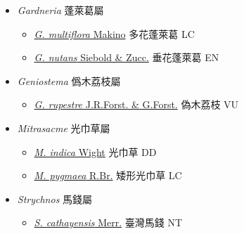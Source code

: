 
  \begin{itemize}
 \item[] \textit{Gardneria} 蓬萊葛屬
                    
  \begin{itemize}
        \item[] \href{http://www.theplantlist.org/tpl1.1/search?q=Gardneria+multiflora}{\textit{G. multiflora} Makino}   多花蓬萊葛 LC
        \item[] \href{http://www.theplantlist.org/tpl1.1/search?q=Gardneria+nutans}{\textit{G. nutans} Siebold \& Zucc.}   垂花蓬萊葛 EN
  \end{itemize}
 \item[] \textit{Geniostema} 僞木荔枝屬
                    
  \begin{itemize}
        \item[] \href{http://www.theplantlist.org/tpl1.1/search?q=Geniostema+rupestre}{\textit{G. rupestre} J.R.Forst. \& G.Forst.}   偽木荔枝 VU
  \end{itemize}
 \item[] \textit{Mitrasacme} 光巾草屬
                    
  \begin{itemize}
        \item[] \href{http://www.theplantlist.org/tpl1.1/search?q=Mitrasacme+indica}{\textit{M. indica} Wight}   光巾草 DD
        \item[] \href{http://www.theplantlist.org/tpl1.1/search?q=Mitrasacme+pygmaea}{\textit{M. pygmaea} R.Br.}   矮形光巾草 LC
  \end{itemize}
 \item[] \textit{Strychnos} 馬錢屬
                    
  \begin{itemize}
        \item[] \href{http://www.theplantlist.org/tpl1.1/search?q=Strychnos+cathayensis}{\textit{S. cathayensis} Merr.}   臺灣馬錢 NT
  \end{itemize}
  \end{itemize}
